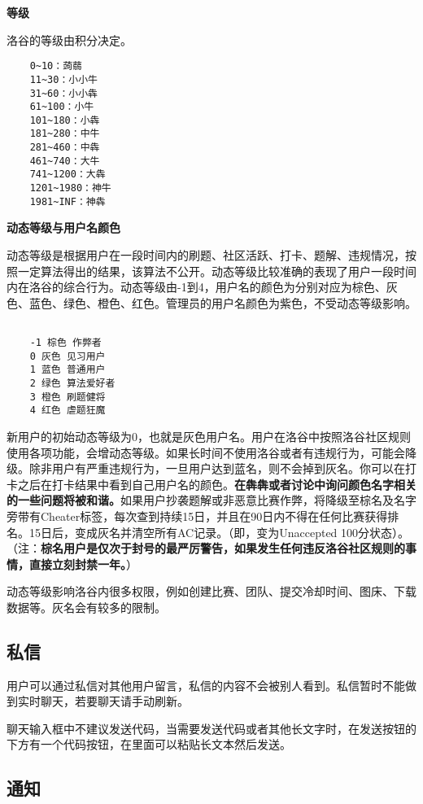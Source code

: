 \documentclass[10pt,a4paper]{article}
\begin{document}
	\textbf{{
			等级}}
	
	
	洛谷的等级由积分决定。
    \begin{verbatim}
	0~10：蒟蒻  
	11~30：小小牛  
	31~60：小小犇
	61~100：小牛
	101~180：小犇
	181~280：中牛
	281~460：中犇
	461~740：大牛
	741~1200：大犇
	1201~1980：神牛
	1981~INF：神犇\end{verbatim}
	
	\textbf{{
			动态等级与用户名颜色}}
	
	
	动态等级是根据用户在一段时间内的刷题、社区活跃、打卡、题解、违规情况，按照一定算法得出的结果，该算法不公开。动态等级比较准确的表现了用户一段时间内在洛谷的综合行为。动态等级由-1到4，用户名的颜色为分别对应为棕色、灰色、蓝色、绿色、橙色、红色。管理员的用户名颜色为紫色，不受动态等级影响。
	\begin{verbatim}
	
	-1 棕色 作弊者
	0 灰色 见习用户 
	1 蓝色 普通用户 
	2 绿色 算法爱好者
	3 橙色 刷题健将
	4 红色 虐题狂魔\end{verbatim}
	
	
	新用户的初始动态等级为0，也就是灰色用户名。用户在洛谷中按照洛谷社区规则使用各项功能，会增动态等级。如果长时间不使用洛谷或者有违规行为，可能会降级。除非用户有严重违规行为，一旦用户达到蓝名，则不会掉到灰名。你可以在打卡之后在打卡结果中看到自己用户名的颜色。\textbf{{在犇犇或者讨论中询问颜色名字相关的一些问题将被和谐。}}如果用户抄袭题解或非恶意比赛作弊，将降级至棕名及名字旁带有Cheater标签，每次查到持续15日，并且在90日内不得在任何比赛获得排名。15日后，变成灰名并清空所有AC记录。（即，变为Unaccepted 
	100分状态）。（注：\textbf{{棕名用户是仅次于封号的最严厉警告，如果发生任何违反洛谷社区规则的事情，直接立刻封禁一年。}}）
	
	
	动态等级影响洛谷内很多权限，例如创建比赛、团队、提交冷却时间、图床、下载数据等。灰名会有较多的限制。
	
	\subsection{
		私信}
	
	
	用户可以通过私信对其他用户留言，私信的内容不会被别人看到。私信暂时不能做到实时聊天，若要聊天请手动刷新。
	
	
	聊天输入框中不建议发送代码，当需要发送代码或者其他长文字时，在发送按钮的下方有一个代码按钮，在里面可以粘贴长文本然后发送。
	
	\subsection{
		通知}
	
\end{document}

